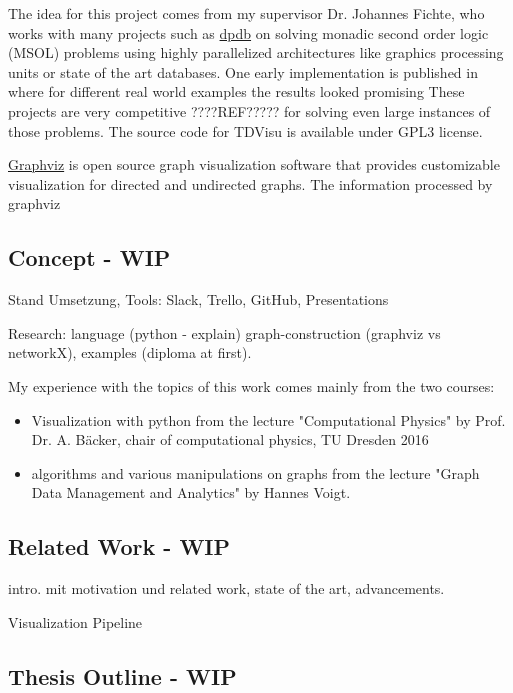 \documentclass[a4paper, 12pt, bibliography=totoc]{scrartcl}
\begin{document}
The idea for this project comes from my supervisor Dr. Johannes Fichte, who works with many projects such as \href{https://github.com/hmarkus/dp_on_dbs}{dpdb} on solving monadic second order logic (MSOL) problems using highly parallelized architectures like graphics processing units or state of the art databases.
One early implementation is published in \cite{evaluationMSO} where for different real world examples the results looked promising
These projects are very competitive ????REF????? for solving even large instances of those problems.
The source code for TDVisu is available under GPL3 license.

\href{https://graphviz.org/}{Graphviz} is open source graph visualization software that provides
customizable visualization for directed and undirected graphs.
The information processed by graphviz 

\subsection{Concept  - WIP}

Stand Umsetzung, Tools: Slack, Trello, GitHub, Presentations

Research: language (python - explain) graph-construction (graphviz vs networkX), examples (diploma at first). 

My experience with the topics of this work comes mainly from the two courses:
\begin{itemize}
	\item Visualization with python from the lecture "Computational Physics" by Prof. Dr. A. Bäcker,
	chair of computational physics, TU Dresden 2016
	\item algorithms and various manipulations on graphs from the lecture "Graph Data Management and Analytics" by Hannes Voigt. \cite{VLGDMA}
\end{itemize}

\subsection{Related Work  - WIP}
intro. mit motivation und related work, state of the art, advancements.

Visualization Pipeline
\subsection{Thesis Outline  - WIP}
\end{document}
